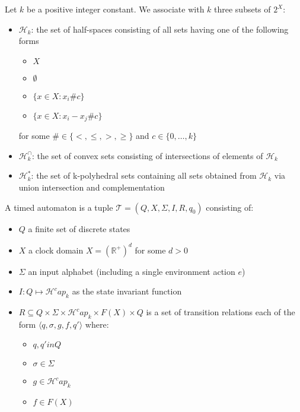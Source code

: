\documentclass[table]{beamer}
\begin{document}
\begin{frame}
	\begin{dfn}
		Let $k$ be a positive integer constant. We associate with $k$ three subsets of $2^X$:
		\begin{itemize}
			\item $\mathcal{H}_k$: the set of half-spaces consisting of all sets having one of the following forms
				\begin{itemize}
					\item $X$
					\item $\emptyset$
					\item $\{x \in X:x_i \# c\}$
					\item $\{x \in X:x_i-x_j \# c\}$
				\end{itemize}
				for some $\# \in \{<,\leq,>,\geq\}$ and $c \in \{0,\ldots,k\}$
			\item $\mathcal{H}^\cap_k$: the set of convex sets consisting of intersections of elements of $\mathcal{H}_k$
			\item $\mathcal{H}^*_k$: the set of k-polyhedral sets containing all sets obtained from $\mathcal{H}_k$ via union intersection and complementation
		\end{itemize}
	\end{dfn}
\end{frame}

\begin{frame}
	\begin{dfn}
		A timed automaton is a tuple $\mathcal{T}=\left( Q,X,\Sigma,I,R,q_0\right)$ consisting of:
		\begin{itemize}
			\item $Q$ a finite set of discrete states
			\item $X$ a clock domain $X=(\mathbb{R}^+)^d$ for some $d>0$
			\item $\Sigma$ an input alphabet (including a single environment action $e$)
			\item $I:Q \mapsto \mathcal{H}^cap_k$ as the state invariant function
			\item $R \subseteq Q \times \Sigma \times \mathcal{H}^cap_k \times F(X) \times Q$ is a set of transition relations each of the form $\langle q,\sigma,g,f,q'\rangle$ where:
			\begin{itemize}
				\item $q,q' in Q$
				\item $\sigma \in \Sigma$
				\item $g \in \mathcal{H}^cap_k$
				\item $f \in F(X)$
			\end{itemize}
		\end{itemize}
	\end{dfn}
\end{frame}
\end{document}
